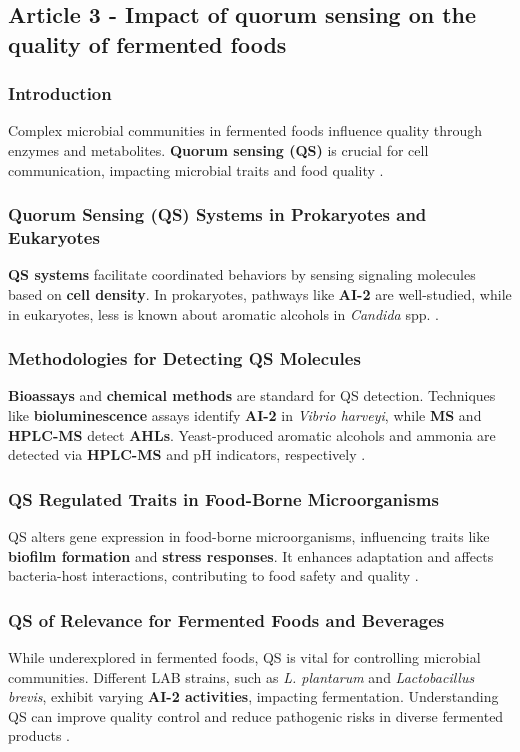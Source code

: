 \subsection{Article 3 - Impact of quorum sensing on the quality of fermented foods}
\subsubsection*{Introduction}
Complex microbial communities in fermented foods influence quality through enzymes and metabolites. \textbf{Quorum sensing (QS)} is crucial for cell communication, impacting microbial traits and food quality \cite*{L8-ImpQuorum}.

\subsubsection*{Quorum Sensing (QS) Systems in Prokaryotes and Eukaryotes}
\textbf{QS systems} facilitate coordinated behaviors by sensing signaling molecules based on \textbf{cell density}. In prokaryotes, pathways like \textbf{AI-2} are well-studied, while in eukaryotes, less is known about aromatic alcohols in \textit{Candida} spp. \cite*{L8-ImpQuorum}.

\subsubsection*{Methodologies for Detecting QS Molecules}
\textbf{Bioassays} and \textbf{chemical methods} are standard for QS detection. Techniques like \textbf{bioluminescence} assays identify \textbf{AI-2} in \textit{Vibrio harveyi}, while \textbf{MS} and \textbf{HPLC-MS} detect \textbf{AHLs}. Yeast-produced aromatic alcohols and ammonia are detected via \textbf{HPLC-MS} and pH indicators, respectively \cite*{L8-ImpQuorum}.

\subsubsection*{QS Regulated Traits in Food-Borne Microorganisms}
QS alters gene expression in food-borne microorganisms, influencing traits like \textbf{biofilm formation} and \textbf{stress responses}. It enhances adaptation and affects bacteria-host interactions, contributing to food safety and quality \cite*{L8-ImpQuorum}.

\subsubsection*{QS of Relevance for Fermented Foods and Beverages}
While underexplored in fermented foods, QS is vital for controlling microbial communities. Different LAB strains, such as \textit{L. plantarum} and \textit{Lactobacillus brevis}, exhibit varying \textbf{AI-2 activities}, impacting fermentation. Understanding QS can improve quality control and reduce pathogenic risks in diverse fermented products \cite*{L8-ImpQuorum}.

